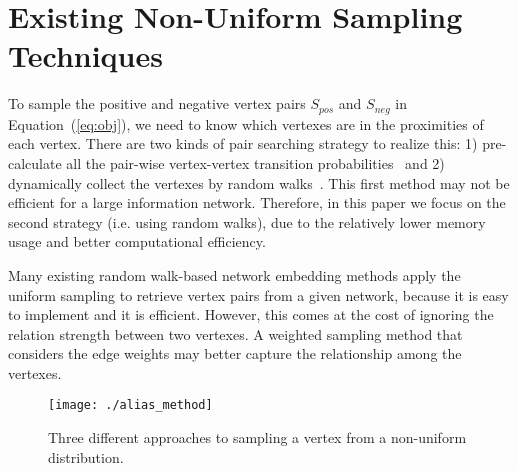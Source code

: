 \section{Existing Non-Uniform Sampling Techniques}
\label{sec_related}

To sample the positive and negative vertex pairs $S_{pos}$ and $S_{neg}$ in Equation~(\ref{eq:obj}), we need to know which vertexes are in the proximities of each vertex.  
There are two kinds of pair searching strategy to realize this: 1) pre-calculate all the pair-wise vertex-vertex transition probabilities~\cite{grarep,dngr} and 2) dynamically collect the vertexes by random walks~\cite{dw,line,hpe,n2v}. 
This first method may not be efficient for a large information network. Therefore, in this paper we focus on the second strategy (i.e. using random walks), due to the relatively lower memory usage and better computational efficiency.


Many existing random walk-based network embedding methods apply the uniform sampling to retrieve vertex pairs from a given network, because it is easy to implement and it is efficient. However, this comes at the cost of ignoring the relation strength between two vertexes. A weighted sampling method that considers the edge weights may better capture the relationship among the vertexes. 

\begin{figure}
\centering
\texttt{[image: ./alias\_method]}
\caption{Three different approaches to sampling a vertex from a non-uniform distribution.}
\label{fig:alias}
\end{figure}

